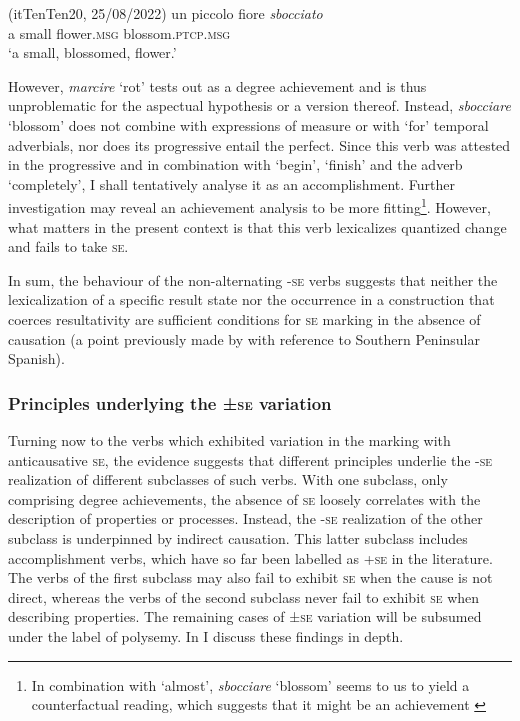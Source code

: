 \documentclass[output=paper,colorlinks,citecolor=brown
]{langscibook}
\begin{document}
\hspace*{\fill}(itTenTen20, 25/08/2022)\quad
\ea \label{bentley_example_19}
    \gll un	piccolo	fiore						\textit{sbocciato}   \\
    a			small			flower.\textsc{msg}	blossom.\textsc{ptcp}.\textsc{msg}	 \\
    \glt ‘a small, blossomed, flower.’
\z

However, \textit{marcire} ‘rot’ tests out as a degree achievement and is thus unproblematic for the aspectual hypothesis or a version thereof. Instead, \textit{sbocciare} ‘blossom’ does not combine with expressions of measure or with ‘for’ temporal adverbials, nor does its progressive entail the perfect. Since this verb was attested in the progressive and in combination with ‘begin’, ‘finish’ and the adverb ‘completely’, I shall tentatively analyse it as an accomplishment. Further investigation may reveal an achievement analysis to be more fitting\footnote{In combination with ‘almost’, \textit{sbocciare} ‘blossom’ seems to us to yield a counterfactual reading, which suggests that it might be an achievement \citep{hay1999scalar}}. However, what matters in the present context is that this verb lexicalizes quantized change and fails to take \textsc{se}. 

In sum, the behaviour of the non-alternating -\textsc{se} verbs suggests that neither the lexicalization of a specific result state nor the occurrence in a construction that coerces resultativity are sufficient conditions for \textsc{se} marking in the absence of causation (a point previously made by \citet{jimenez2017causativity} with reference to Southern Peninsular Spanish).  

\subsubsection{Principles underlying the ±\textsc{se} variation}
\label{bentley_section_3.3.3}
Turning now to the verbs which exhibited variation in the marking with anticausative \textsc{se}, the evidence suggests that different principles underlie the -\textsc{se} realization of different subclasses of such verbs. With one subclass, only comprising degree achievements, the absence of \textsc{se} loosely correlates with the description of properties or processes. Instead, the -\textsc{se} realization of the other subclass is underpinned by indirect causation. This latter subclass includes accomplishment verbs, which have so far been labelled as +\textsc{se} in the literature. The verbs of the first subclass may also fail to exhibit \textsc{se} when the cause is not direct, whereas the verbs of the second subclass never fail to exhibit \textsc{se} when describing properties. The remaining cases of ±\textsc{se} variation will be subsumed under the label of polysemy. In  I discuss these findings in depth.
\end{document}
